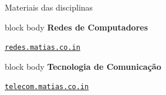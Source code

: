 \documentclass[aspectratio=169,11pt]{beamer}
\begin{document}
\begin{frame}{Materiais das disciplinas}
  \vspace{1.0em}
  \begin{beamercolorbox}[wd=\linewidth,sep=0.8em,rounded=true]{block body}
    {\color{caipyraRed}\bfseries Redes de Computadores}\par
    \vspace{0.2em}
    \Large\href{https://redes.matias.co.in}{\texttt{redes.matias.co.in}}
  \end{beamercolorbox}

  \vspace{0.9em}
  \begin{beamercolorbox}[wd=\linewidth,sep=0.8em,rounded=true]{block body}
    {\color{caipyraOrange}\bfseries Tecnologia de Comunicação}\par
    \vspace{0.2em}
    \Large\href{https://telecom.matias.co.in}{\texttt{telecom.matias.co.in}}
  \end{beamercolorbox}
\end{frame}
\end{document}
